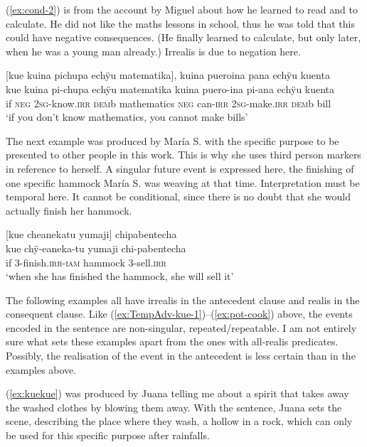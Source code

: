 (\ref{ex:cond-2}) is from the account by Miguel about how he learned to read and to calculate. He did not like the maths lessons in school, thus he was told that this could have negative consequences. (He finally learned to calculate, but only later, when he was a young man already.) Irrealis is due to negation here.

\ea\label{ex:cond-2}
\begingl
\glpreamble \textup{[}kue kuina pichupa echÿu matematika\textup{]}, kuina pueroina pana echÿu kuenta\\
\gla kue kuina pi-chupa echÿu matematika kuina puero-ina pi-ana echÿu kuenta\\
\glb if \textsc{neg} 2\textsc{sg}-know.\textsc{irr} \textsc{dem}b mathematics \textsc{neg} can-\textsc{irr} 2\textsc{sg}-make.\textsc{irr} \textsc{dem}b bill\\
\glft ‘if you don’t know mathematics, you cannot make bills’
\endgl
\trailingcitation{[mxx-p181027l-1.106]}
\xe

The next example was produced by María S. with the specific purpose to be presented to other people in this work. This is why she uses third person markers in reference to herself.  A singular future event is expressed here, the finishing of one specific hammock María S. was weaving at that time. Interpretation must be temporal here. It cannot be conditional, since there is no doubt that she would actually finish her hammock.

\ea\label{ex:irr-kue-1}
\begingl
\glpreamble \textup{[}kue cheanekatu yumaji\textup{]} chipabentecha\\
\gla kue chÿ-eaneka-tu yumaji chi-pabentecha\\
\glb if 3-finish.\textsc{irr}-\textsc{iam} hammock 3-sell.\textsc{irr}\\
\glft ‘when she has finished the hammock, she will sell it’
\endgl
\trailingcitation{[rxx-e181022le]}
\xe

The following examples all have irrealis in the antecedent clause and realis in the consequent clause. Like (\ref{ex:TempAdv-kue-1})–(\ref{ex:pot-cook}) above, the events encoded in the sentence are non-singular, repeated/repeatable. I am not entirely sure what sets these examples apart from the ones with all-realis predicates. Possibly, the realisation of the event in the antecedent is less certain than in the examples above.

(\ref{ex:kuekue}) was produced by Juana telling me about a spirit that takes away the washed clothes by blowing them away. With the sentence, Juana sets the scene, describing the place where they wash, a hollow in a rock, which can only be used for this specific purpose after rainfalls.

